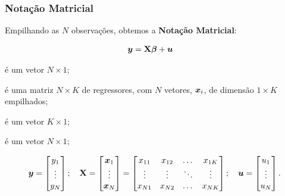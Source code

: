 \documentclass[11pt, oneside, a4paper, article]{article}
\numberwithin{equation}{section}
\begin{document}
\subsubsection{Notação Matricial}
Empilhando as $N$ observações, obtemos a \textbf{Notação Matricial}:

\vspace{-1 em}
\begin{align} \label{ols:mod:mat}
	\boldsymbol{y} &= \mathbf{X} \boldsymbol{\beta} + \boldsymbol{u} 
\end{align}

\begin{description}[noitemsep]
\item [$\yvec$]  é um vetor $N \times 1$;

\item [$\Xmat$]  é uma matriz $N \times K$ de regressores, com $N$ vetores, $\boldsymbol{x}_{i}$, de dimensão $1 \times K$ empilhados;

\item [$\betavec$] é um vetor $K \times 1$;

\item [$\uvec$] é um vetor $N \times 1$;
\end{description}

\vspace{-1 em}
\begin{align*}
\boldsymbol{y} = 
\begin{bmatrix}
	y_{1} \\ \vdots \\ y_{N}		
\end{bmatrix};
\quad
\mathbf{X} = 
\begin{bmatrix}
	\boldsymbol{x}_{1} \\ \vdots \\ \boldsymbol{x}_{N}
\end{bmatrix} = 
\begin{bmatrix}
	x_{11}     & x_{12}     & \dots  & x_{1K} \\          
	\vdots     & \vdots     & \ddots & \vdots \\        
	x_{N1} & x_{N2} & \dots  & x_{NK}		
\end{bmatrix};
\quad
\boldsymbol{u} = 
\begin{bmatrix}
	u_{1} \\ \vdots \\ u_{N}		
\end{bmatrix}.
\end{align*}
\end{document}
